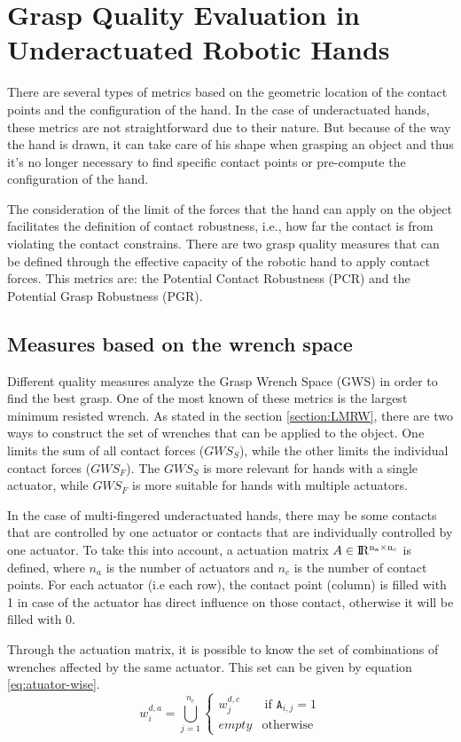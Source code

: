 \section{Grasp Quality Evaluation in Underactuated Robotic Hands}
There are several types of metrics based on the geometric location of the contact points and the configuration of the hand.
In the case of underactuated hands, these metrics are not straightforward due to their nature.
But because of the way the hand is drawn, it can take care of his shape when grasping an object and thus it's no longer necessary to find specific contact points or pre-compute the configuration of the hand. \par
The consideration of the limit of the forces that the hand can apply on the object facilitates the definition of contact robustness, i.e., how far the contact is from violating the contact constrains.
There are two grasp quality measures that can be defined through the effective capacity of the robotic hand to apply contact forces.
This metrics are: the Potential Contact Robustness (PCR) and the Potential Grasp Robustness (PGR).

\subsection{Measures based on the wrench space}
Different quality measures analyze the Grasp Wrench Space (GWS) in order to find the best grasp. One of the most known of these metrics is the largest minimum resisted wrench.
As stated in the section \ref{section:LMRW}, there are two ways to construct the set of wrenches that can be applied to the object. One limits the sum of all contact forces ($GWS_S$), while the other limits the individual contact forces ($GWS_F$).
The $GWS_S$ is more relevant for hands with a single actuator, while $GWS_F$  is more suitable for hands with multiple actuators. \par
In the case of multi-fingered underactuated hands, there may be some contacts that are controlled by one actuator or contacts that are individually  controlled by one actuator. 
To take this into account, a actuation matrix $A  \in \rm I\!R^{n_a \times n_c}$ is defined, where $n_a$ is the number of actuators and $n_c$ is the number of contact points. For each actuator (i.e each row), the contact point (column) is filled with 1 in case of the actuator has direct influence on those contact, otherwise it will be filled with 0.\par
Through the actuation matrix, it is possible to know the set of combinations of wrenches affected by the same actuator. This set can be given by equation \eqref{eq:atuator-wise}.
\begin{equation}\label{eq:atuator-wise}
    w_i^{d,a}= \bigcup_{j=1}^{n_c}
        \begin{cases}
        w_j^{d,c} & \ \text{if } \texttt{A}_{i,j} = 1\\
        \textit{empty} &  \text{otherwise}
    \end{cases}
\end{equation}

